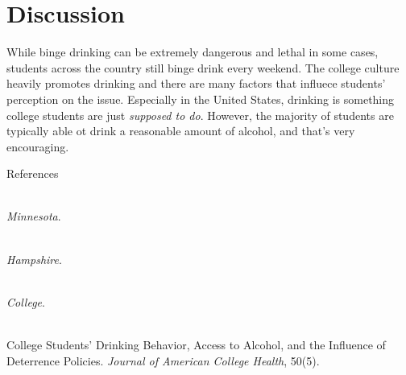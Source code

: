 \documentclass[12pt, man]{apa6}
\begin{document}
\section{Discussion}
While binge drinking can be extremely dangerous and lethal in some cases, students across the country still binge drink every weekend. The college culture heavily promotes drinking and there are many factors that influece students' perception on the issue. Especially in the United States, drinking is something college students are just \textit{supposed to do}. However, the majority of students are typically able ot drink a reasonable amount of alcohol, and that's very encouraging.

\newpage
\centerline{References}


\\
\textit{Minnesota}.

\\
\textit{Hampshire}.

\\
\textit{College}.


\\
College Students' Drinking Behavior, Access to Alcohol, and the Influence of\\
Deterrence Policies. \textit{Journal of American College Health}, 50(5).
\end{document}
